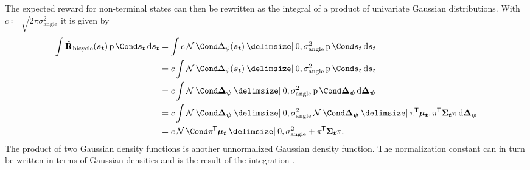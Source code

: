 The expected reward for non-terminal states can then be rewritten as the integral of a product of univariate Gaussian distributions.
With $c \coloneqq \sqrt{2\pi\sigma_{\text{angle}}^2}$ it is given by
\begin{align}
    \begin{split}
        \int \RwdBicycleHat(\rv{s_t}) \Prob{\rv{s_t}} \diff \rv{s_t} &=  \int c \Gaussian{\Delta_\psi(\rv{s_t}) \given 0, \sigma_{\text{angle}}^2} \Prob{\rv{s_t}} \diff \rv{s_t} \\
        &= c \int \Gaussian{\Delta_\psi(\rv{s_t}) \given 0, \sigma_{\text{angle}}^2} \Prob{\rv{s_t}} \diff \rv{s_t} \\
        &= c \int \Gaussian{\rv{\Delta_\psi} \given 0, \sigma_{\text{angle}}^2} \Prob{\rv{\Delta_\psi}} \diff \rv{\Delta_\psi} \\
        &= c \int \Gaussian{\rv{\Delta_\psi} \given 0, \sigma_{\text{angle}}^2} \Gaussian{\rv{\Delta_\psi} \given \pi\tran \mat{\mu_t}, \pi\tran \mat{\Sigma_t} \pi} \diff \rv{\Delta_\psi} \\
        &= c \Gaussian{\pi\tran \mat{\mu_t} \given 0, \sigma_{\text{angle}}^2 + \pi\tran \mat{\Sigma_t} \pi}.
    \end{split}
\end{align}
The product of two Gaussian density functions is another unnormalized Gaussian density function.
The normalization constant can in turn be written in terms of Gaussian densities and is the result of the integration \cite{petersen_matrix_2008}.

